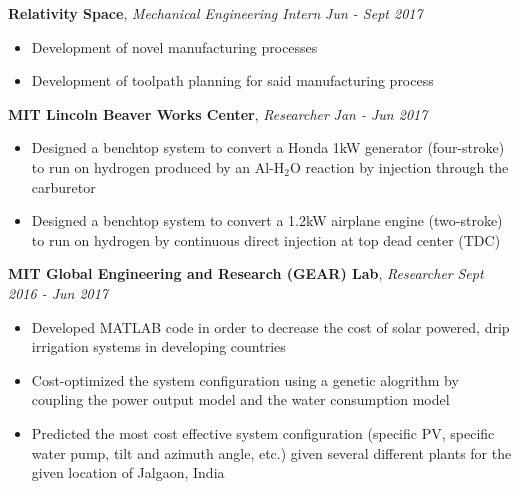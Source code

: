 \documentclass[9pt]{article}
\newenvironment{changemargin}[2]{%
  \begin{list}{}{%
    \setlength{\topsep}{0pt}%
    \setlength{\leftmargin}{#1}%
    \setlength{\rightmargin}{#2}%
    \setlength{\listparindent}{\parindent}%
    \setlength{\itemindent}{\parindent}%
    \setlength{\parsep}{\parskip}%
  }%
  \item[]}{\end{list}
}
\newcommand{\jobdescription}[1]{
	\begin{changemargin}{0.15in}{0.15in}
    \smallskip
		{#1}
    \medskip
	\end{changemargin}
}
\newcommand{\jobtitle}[3]{
	\textbf{#1}, \emph{#2} \hfill \emph{#3}\\
}
\newenvironment{body} {
	\vspace*{-16pt}
	\begin{changemargin}{-0.25in}{-0.5in}
  }	
	{\end{changemargin}
}
\begin{document}
\begin{body}
	\vspace{14pt}

  \jobtitle{Relativity Space}{Mechanical Engineering Intern}{Jun - Sept 2017}
  \jobdescription{
    \begin{itemize} \itemsep -0pt  %
      \item Development of novel manufacturing processes
      \item Development of toolpath planning for said manufacturing process
    \end{itemize}
  }

  \jobtitle{MIT Lincoln Beaver Works Center}{Researcher}{Jan - Jun 2017}
  \jobdescription{
    \begin{itemize} \itemsep -0pt  %
      \item Designed a benchtop system to convert a Honda 1kW generator (four-stroke) to run on hydrogen produced by an Al-H$_2$O reaction by injection through the carburetor 
      \item Designed a benchtop system to convert a 1.2kW airplane engine (two-stroke) to run on hydrogen by continuous direct injection at top dead center (TDC)
    \end{itemize}
  }
  
  \jobtitle{MIT Global Engineering and Research (GEAR) Lab}{Researcher}{Sept 2016 - Jun 2017}
  \jobdescription{
    \begin{itemize} \itemsep -0pt  %
      \item Developed MATLAB code in order to decrease the cost of solar powered, drip irrigation systems in developing countries
      \item Cost-optimized the system configuration using a genetic alogrithm by coupling the power output model and the water consumption model
      \item Predicted the most cost effective system configuration (specific PV, specific water pump, tilt and azimuth angle, etc.) given several different plants for the given location of Jalgaon, India
    \end{itemize}
  }
  

\end{body}
\end{document}
